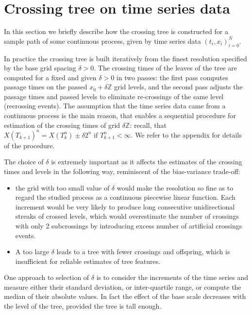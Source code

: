 
\section{Crossing tree on time series data} %
\label{sec:crossing_tree_on_time_series_data}

In this section we briefly describe how the crossing tree is constructed for a sample
path of some continuous process, given by time series data $(t_i, x_i)_{i=0}^N$.

In practice the crossing tree is built iteratively from the finest resolution
specified by the base grid spacing $\delta > 0$. The crossing times of the leaves
of the tree are computed for a fixed and given $\delta>0$ in two passes: the first
pass computes passage times on the passed $x_0+\delta \mathbb{Z}$ grid levels, and
the second pass adjusts the passage times and passed levels to eliminate re-crossings
of the same level (recrossing events). The assumption that the time series data
came from a continuous process is the main reason, that enables a sequential procedure
for estimation of the crossing times of grid $\delta\mathbb{Z}$: recall, that
$X(T_{k+1})^n = X(T_k^n) \pm\delta2^n$ if $T_{k+1}^n<\infty$. We refer to the
appendix for details of the procedure.

The choice of $\delta$ is extremely important as it affects the estimates of the
crossing times and levels in the following way, reminiscent of the bias-variance
trade-off:
\begin{itemize}
    \item the grid with too small value of $\delta$ would make the resolution so
    fine as to regard the studied process as a continuous piecewise linear function.
    Each increment would be very likely to produce long consecutive unidirectional
    streaks of crossed levels, which would overestimate the number of crossings
    with only 2 subcrossings by introducing excess number of artificial crossings
    events.
    \item A too large $\delta$ leads to a tree with fewer crossings and offspring,
    which is insufficient for reliable estimates of tree features.
\end{itemize}
One approach to selection of $\delta$ is to consider the increments of the time
series and measure either their standard deviation, or inter-quartile range, or
compute the median of their absolute values. In fact the effect of the base scale
decreases with the level of the tree, provided the tree is tall enough.


